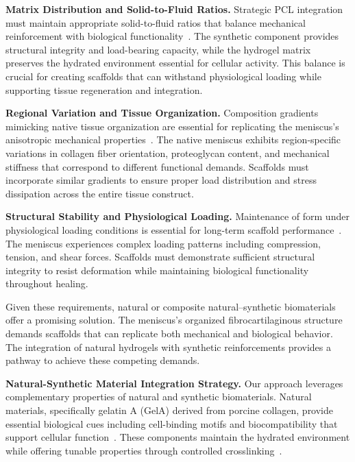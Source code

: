 \textbf{Matrix Distribution and Solid-to-Fluid Ratios.} Strategic PCL integration must maintain appropriate solid-to-fluid ratios that balance mechanical reinforcement with biological functionality~\cite{elkommos2025hybridhydrogels, fares2018interpenetratingnetwork}. The synthetic component provides structural integrity and load-bearing capacity, while the hydrogel matrix preserves the hydrated environment essential for cellular activity. This balance is crucial for creating scaffolds that can withstand physiological loading while supporting tissue regeneration and integration.

\textbf{Regional Variation and Tissue Organization.} Composition gradients mimicking native tissue organization are essential for replicating the meniscus's anisotropic mechanical properties~\cite{bahcecioglu20193dprinted, du2023meniscusheterogeneity, bulle2021humanmeniscus}. The native meniscus exhibits region-specific variations in collagen fiber orientation, proteoglycan content, and mechanical stiffness that correspond to different functional demands. Scaffolds must incorporate similar gradients to ensure proper load distribution and stress dissipation across the entire tissue construct.

\textbf{Structural Stability and Physiological Loading.} Maintenance of form under physiological loading conditions is essential for long-term scaffold performance~\cite{bilgen2018currentconcepts, ghodbane2019partialmeniscus}. The meniscus experiences complex loading patterns including compression, tension, and shear forces. Scaffolds must demonstrate sufficient structural integrity to resist deformation while maintaining biological functionality throughout healing.

Given these requirements, natural or composite natural--synthetic biomaterials offer a promising solution. The meniscus's organized fibrocartilaginous structure demands scaffolds that can replicate both mechanical and biological behavior. The integration of natural hydrogels with synthetic reinforcements provides a pathway to achieve these competing demands.

\textbf{Natural-Synthetic Material Integration Strategy.} Our approach leverages complementary properties of natural and synthetic biomaterials. Natural materials, specifically gelatin A (GelA) derived from porcine collagen, provide essential biological cues including cell-binding motifs and biocompatibility that support cellular function~\cite{ahmed2015hydrogelpreparation, zhang2005electrospinninggelatin}. These components maintain the hydrated environment while offering tunable properties through controlled crosslinking~\cite{ronca2023developmenthighly, osaki2018microphysiological3d,guarino2011hmscinteraction, ratner2013naturematter, chaudhuri2016hydrogelstunable}.

